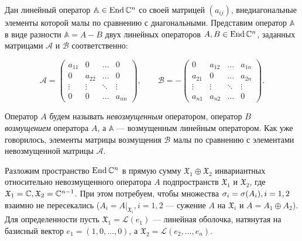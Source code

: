 Дан линейный оператор $\mathbb{A} \in \operatorname{End}\mathbb{C}^n$ со своей матрицей $\left( a_{ij} \right)$, внедиагональные элементы которой малы по сравнению с диагональными. Представим оператор $\mathbb{A}$ в виде разности $\mathbb{A} = A-B$ двух линейных операторов $\\A,B \in \operatorname{End}\mathbb{C}^n$, заданных матрицами $\mathcal{A} \text{ и } \mathcal{B}$ соответственно:

$$
	\mathcal{A} = \begin{pmatrix}
		a_{11} & 0      & \dots  & 0      \\
		0      & a_{22} & \dots  & 0      \\
		\vdots & \vdots & \ddots & \vdots \\
		0      & 0      & \dots  & a_{nn}
	\end{pmatrix},
	\qquad
	\mathcal{B} = -\begin{pmatrix}
		0      & a_{12} & \dots  & a_{1n} \\
		a_{21} & 0      & \dots  & a_{2n} \\
		\vdots & \vdots & \ddots & \vdots \\
		a_{n1} & a_{n2} & \dots  & 0
	\end{pmatrix}.
$$

Оператор $A$ будем называть {\em невозмущенным} оператором, оператор $B$ {\em возмущением} оператора $A$, а $\mathbb{A}$ --- возмущенным линейным оператором. Как уже говорилось, элементы матрицы возмущения $\mathcal{B}$ малы по сравнению с элементами невозмущенной матрицы $\mathcal{A}$.

Разложим пространство $\operatorname{End}\mathbb{C}^n$ в прямую сумму $\mathfrak{X}_1 \oplus \mathfrak{X}_2$ инвариантных относительно невозмущенного оператора $A$ подпространств $\mathfrak{X}_1$ и $\mathfrak{X}_2$, где $\mathfrak{X}_1 = \mathbb{C}, \mathfrak{X}_2 = \mathbb{C}^{n-1}$. При этом потребуем, чтобы множества $\sigma_i = \sigma(A_i),\\ i=1,2$ взаимно не пересекались ($A_i = \left. A \right|_{\mathfrak{X}_i}, i=1,2$ --- сужение $A$ на $\mathfrak{X}_i$ и $A = A_1 \oplus A_2$). Для определенности пусть $\mathfrak{X}_1 = \mathcal{L}(e_1)$ --- линейная оболочка, натянутая на базисный вектор $e_1 = (1,0, \dots, 0)$, а $\mathfrak{X}_2 = \mathcal{L}(e_2, \dots, e_n)$.

